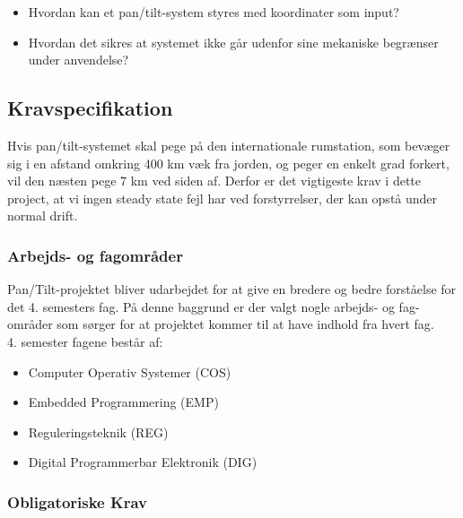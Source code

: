 \begin{itemize}
	\item Hvordan kan et pan/tilt-system styres med koordinater som input?
	\item Hvordan det sikres at systemet ikke går udenfor sine mekaniske begrænser under anvendelse?
\end{itemize}

\subsection{Kravspecifikation}

Hvis pan/tilt-systemet skal pege på den internationale rumstation, som bevæger sig i en afstand omkring 400 km væk fra jorden, og peger en enkelt grad forkert, vil den næsten pege 7 km ved siden af. Derfor er det vigtigeste krav i dette project, at vi ingen steady state fejl har ved forstyrrelser, der kan opstå under normal drift.

\subsubsection{Arbejds- og fagområder}
Pan/Tilt-projektet bliver udarbejdet for at give en bredere og bedre forståelse for det 4. semesters fag. På denne baggrund er der valgt nogle arbejds- og fag-områder som sørger for at projektet kommer til at have indhold fra hvert fag.\\
4. semester fagene består af:
\begin{itemize}[noitemsep]
	\item Computer Operativ Systemer (COS)
	\item Embedded Programmering (EMP)
	\item Reguleringsteknik (REG)
	\item Digital Programmerbar Elektronik (DIG)
\end{itemize}

\subsubsection{Obligatoriske Krav}

